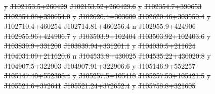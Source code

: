 \documentclass[11pt, a4paper]{book}
\providecommand{\DIFdeltex}[1]{{\protect\color{red}\sout{#1}}}                      %
\providecommand{\DIFdelFL}[1]{\DIFdel{#1}} %
\providecommand{\DIFdel}[1]{\texorpdfstring{\DIFdeltex{#1}}{}} %
\begin{document}
\DIFdelFL{y}%
\DIFdelFL{J102153.5+260429 }%
\DIFdelFL{J102153.52+260429.6 }%
\DIFdelFL{y}%
\DIFdelFL{J102354.7+390653 }%
\DIFdelFL{J102354.88+390654.0 }%
\DIFdelFL{y}%
\DIFdelFL{J102620.4+303600 }%
\DIFdelFL{J102620.46+303550.4 }%
\DIFdelFL{y}%
\DIFdelFL{J102710.4+460254 }%
\DIFdelFL{J102714.81+460256.4 }%
\DIFdelFL{n}%
\DIFdelFL{J102955.9+424906 }%
\DIFdelFL{J102955.96+424906.7 }%
\DIFdelFL{y}%
\DIFdelFL{J103503.9+102404 }%
\DIFdelFL{J103503.92+102403.6 }%
\DIFdelFL{y}%
\DIFdelFL{J103839.9+331200 }%
\DIFdelFL{J103839.94+331201.1 }%
\DIFdelFL{y}%
\DIFdelFL{J104030.5+211624 }%
\DIFdelFL{J104031.09+211620.6 }%
\DIFdelFL{n}%
\DIFdelFL{J104533.8+430025 }%
\DIFdelFL{J104535.22+430020.8 }%
\DIFdelFL{y}%
\DIFdelFL{J104907.5+322903 }%
\DIFdelFL{J104907.91+322906.6 }%
\DIFdelFL{y}%
\DIFdelFL{J105146.9+552257 }%
\DIFdelFL{J105147.40+552308.4 }%
\DIFdelFL{y}%
\DIFdelFL{J105257.5+105418 }%
\DIFdelFL{J105257.53+105421.5 }%
\DIFdelFL{y}%
\DIFdelFL{J105521.6+372641 }%
\DIFdelFL{J105521.24+372652.4 }%
\DIFdelFL{y}%
\DIFdelFL{J105758.8+321605 }%
\end{document}
